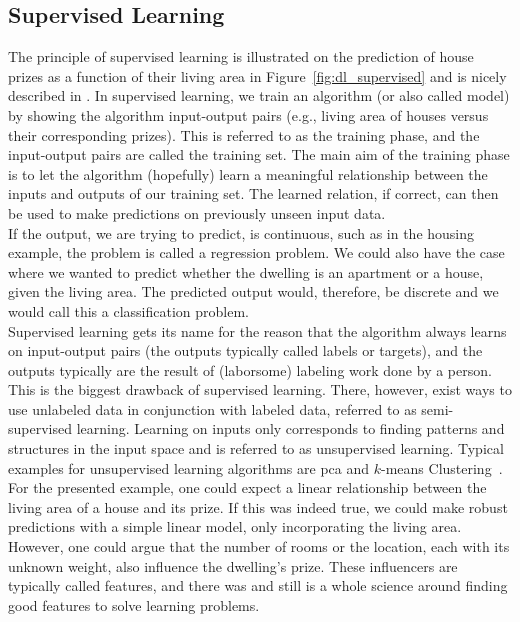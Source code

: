 \subsection{Supervised Learning}
The principle of supervised learning is illustrated on the prediction of house prizes as a function of their living area in Figure~\ref{fig:dl_supervised} and is nicely described in \cite{Ng2012CS229Notes}. In supervised learning, we train an algorithm (or also called model) by showing the algorithm input-output pairs (e.g., living area of houses versus their corresponding prizes). This is referred to as the training phase, and the input-output pairs are called the training set. The main aim of the training phase is to let the algorithm (hopefully) learn a meaningful relationship between the inputs and outputs of our training set. The learned relation, if correct, can then be used to make predictions on previously unseen input data.\\
If the output, we are trying to predict, is continuous, such as in the housing example, the problem is called a regression problem. We could also have the case where we wanted to predict whether the dwelling is an apartment or a house, given the living area. The predicted output would, therefore, be discrete and we would call this a classification problem.\\
Supervised learning gets its name for the reason that the algorithm always learns on input-output pairs (the outputs typically called labels or targets), and the outputs typically are the result of (laborsome) labeling work done by a person. This is the biggest drawback of supervised learning. There, however, exist ways to use unlabeled data in conjunction with labeled data, referred to as semi-supervised learning. Learning on inputs only corresponds to finding patterns and structures in the input space and is referred to as unsupervised learning. Typical examples for unsupervised learning algorithms are \gls{pca} and $k$-means Clustering~\cite{Goodfellow2016DeepLearning}.\\
For the presented example, one could expect a linear relationship between the living area of a house and its prize. If this was indeed true, we could make robust predictions with a simple linear model, only incorporating the living area. However, one could argue that the number of rooms or the location, each with its unknown weight, also influence the dwelling's prize. These influencers are typically called features, and there was and still is a whole science around finding good features to solve learning problems.\\
